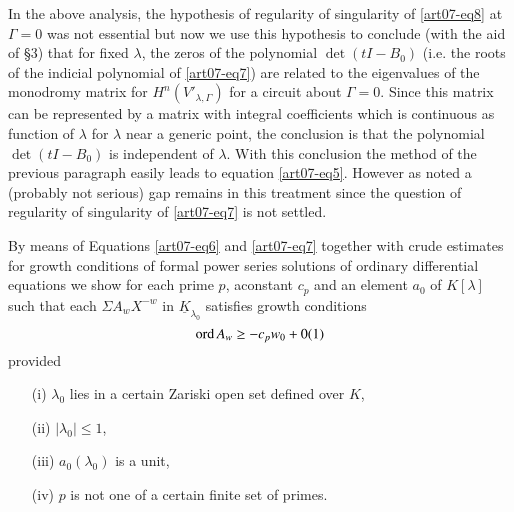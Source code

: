 \begin{method}\label{art07-method1}
In the above analysis, the hypothesis of regularity of singularity of \eqref{art07-eq8} at $\Gamma=0$ was not essential but now we use this hypothesis to conclude (with the aid of \S3) that for fixed $\lambda$, the zeros of the polynomial $\det(tI-B_{0})$ (i.e. the roots of the indicial polynomial of \eqref{art07-eq7}) are related to the eigenvalues of the monodromy matrix for $H^{n}(V'_{\lambda,\Gamma})$ for a circuit about $\Gamma=0$. Since this matrix can be represented by a matrix with integral coefficients which is continuous as function of $\lambda$ for $\lambda$ near a generic point, the conclusion is that the polynomial $\det (tI-B_{0})$ is independent of $\lambda$. With this conclusion the method of the previous paragraph easily leads to equation \eqref{art07-eq5}. However as noted a (probably not serious) gap remains in this treatment since the question of regularity of singularity of \eqref{art07-eq7} is not settled.
\end{method}

\begin{method}\label{art07-method2}
By means of Equations \eqref{art07-eq6} and \eqref{art07-eq7} together with crude estimates for growth conditions of formal power series solutions of ordinary differential equations we show for each prime $p$, a\pageoriginale constant $c_{p}$ and an element $a_{0}$ of $K[\lambda]$ such that each $\Sigma A_{w}X^{-w}$ in $\underline{K}_{\lambda_{0}}$ satisfies growth conditions
\begin{equation}
\operatorname{\mathrm{ord}} A_{w}\geq -c_{p}w_{0}+0(1)\label{art07-eq9}
\end{equation}
provided
\begin{itemize}
\item[(i)] $\lambda_{0}$ lies in a certain Zariski open set defined over $K$,

\item[(ii)] $|\lambda_{0}|\leq 1$,

\item[(iii)] $a_{0}(\lambda_{0})$ is a unit,

\item[(iv)] $p$ is not one of a certain finite set of primes.
\end{itemize}
\end{method}

